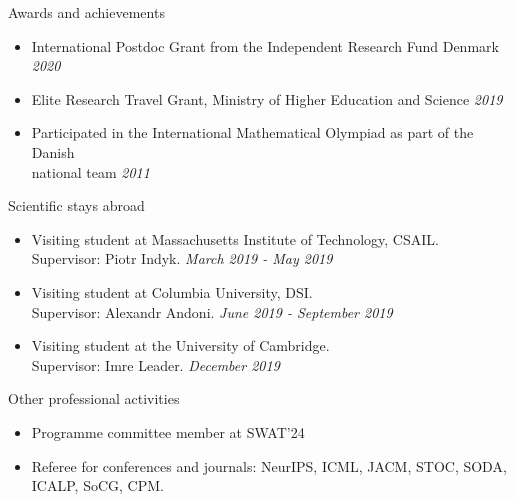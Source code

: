 \documentclass{resume} %
\begin{document}

\begin{rSection}{Awards and achievements}
\begin{itemize}
\item International Postdoc Grant from the Independent Research Fund Denmark  \hfill{\emph{2020}} 
\item Elite Research Travel Grant, Ministry of Higher Education and Science  \hfill{\emph{2019}} 
\item Participated in the International Mathematical Olympiad as part of the Danish \\ national team  \hfill{\emph{2011}}
\end{itemize}
\end{rSection}

\begin{rSection}{Scientific stays abroad}
\begin{itemize}
\item Visiting student at Massachusetts Institute of Technology, CSAIL. \\Supervisor: Piotr Indyk. \hfill{\emph{March 2019 - May 2019}}
\item Visiting student at Columbia University, DSI. \\ Supervisor: Alexandr Andoni. \hfill{\emph{June 2019 - September 2019}}
\item Visiting student at the University of Cambridge.  \\Supervisor: Imre Leader. \hfill{\emph{December 2019}}
\end{itemize}

\end{rSection}


\begin{rSection}{Other professional activities}
\begin{itemize}
\item Programme committee member at SWAT'24
\item Referee for conferences and journals: NeurIPS, ICML, JACM, STOC, SODA, ICALP, SoCG, CPM.
\end{itemize}

\end{rSection}
\end{document}

